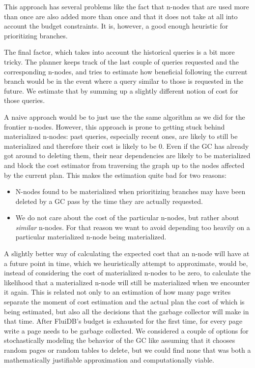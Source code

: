 This approach has several problems like the fact that n-nodes that are
used more than once are also added more than once and that it does not take
at all into account the budget constraints. It is, however, a good
enough heuristic for prioritizing branches.

The final factor, which takes into account the historical queries is a
bit more tricky. The planner keeps track of the last couple of queries
requested and the corresponding n-nodes, and tries to estimate how
beneficial following the current branch would be in the event where
a query similar to those is requested in the future. We estimate that
by summing up a slightly different notion of cost for those queries.

A naive approach would be to just use the the same algorithm as we did
for the frontier n-nodes. However, this approach is prone to getting
stuck behind materialized n-nodes: past queries, especially recent ones,
are likely to still be materialized and therefore their cost is likely
to be 0. Even if the GC has already got around to deleting them, their near
dependencies are likely to be materialized and block the cost estimator
from traversing the graph up to the nodes affected by the current plan. This makes
the estimation quite bad for two reasons:

\begin{itemize}
\item N-nodes found to be materialized when prioritizing branches may have been
  deleted by a GC pass by the time they are actually requested.
\item We do not care about the cost of the particular n-nodes, but rather
  about \emph{similar} n-nodes. For that reason we want to avoid
  depending too heavily on a particular materialized n-node being
  materialized.
\end{itemize}

A slightly better way of calculating the expected cost that an n-node will
have at a future point in time, which we
heuristically attempt to approximate, would be, instead of
considering the cost of materialized n-nodes to be zero, to calculate
the likelihood that a materialized n-node will still be materialized
when we encounter it again. This is related not only to an estimation
of how many page writes separate the moment of cost estimation and the
actual plan the cost of which is being estimated, but also all the
decisions that the garbage collector will make in that time. After
FluiDB's budget is exhausted for the first time, for every page write
a page needs to be garbage collected. We considered a couple of
options for stochastically modeling the behavior of the GC like
assuming that it chooses random pages or random tables to delete, but
we could find none that was both a mathematically justifiable approximation and
computationally viable.

